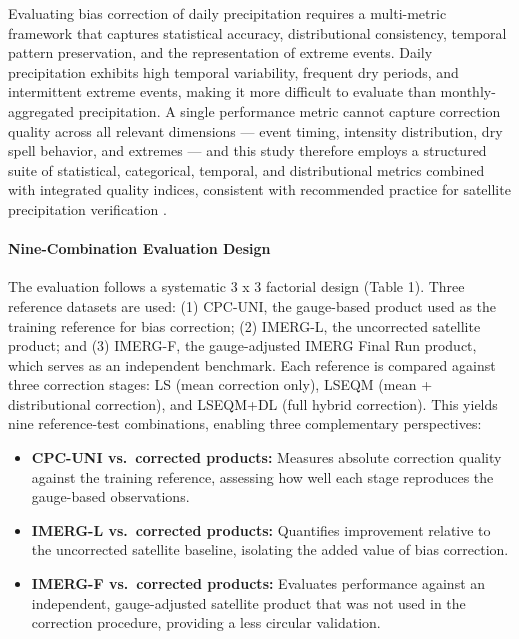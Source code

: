 \documentclass[remotesensing,article,submit,pdftex,moreauthors]{Definitions/mdpi}
\providecommand{\tightlist}{\setlength{\itemsep}{0pt}\setlength{\parskip}{0pt}}
\begin{document}
Evaluating bias correction of daily precipitation requires a
multi-metric framework that captures statistical accuracy,
distributional consistency, temporal pattern preservation, and the
representation of extreme events. Daily precipitation exhibits high
temporal variability, frequent dry periods, and intermittent extreme
events, making it more difficult to evaluate than monthly-aggregated
precipitation. A single performance metric cannot capture correction
quality across all relevant dimensions --- event timing, intensity
distribution, dry spell behavior, and extremes --- and this study
therefore employs a structured suite of statistical, categorical,
temporal, and distributional metrics combined with integrated quality
indices, consistent with recommended practice for satellite
precipitation verification \cite{ref14,ref15}.

\paragraph{Nine-Combination Evaluation
Design}\label{nine-combination-evaluation-design}

The evaluation follows a systematic 3 x 3 factorial design (Table 1).
Three reference datasets are used: (1) CPC-UNI, the gauge-based product
used as the training reference for bias correction; (2) IMERG-L, the
uncorrected satellite product; and (3) IMERG-F, the gauge-adjusted IMERG
Final Run product, which serves as an independent benchmark. Each
reference is compared against three correction stages: LS (mean
correction only), LSEQM (mean + distributional correction), and LSEQM+DL
(full hybrid correction). This yields nine reference-test combinations,
enabling three complementary perspectives:

\begin{itemize}
\tightlist
\item
  \textbf{CPC-UNI vs.~corrected products:} Measures absolute correction
  quality against the training reference, assessing how well each stage
  reproduces the gauge-based observations.
\item
  \textbf{IMERG-L vs.~corrected products:} Quantifies improvement
  relative to the uncorrected satellite baseline, isolating the added
  value of bias correction.
\item
  \textbf{IMERG-F vs.~corrected products:} Evaluates performance against
  an independent, gauge-adjusted satellite product that was not used in
  the correction procedure, providing a less circular validation.
\end{itemize}
\end{document}
